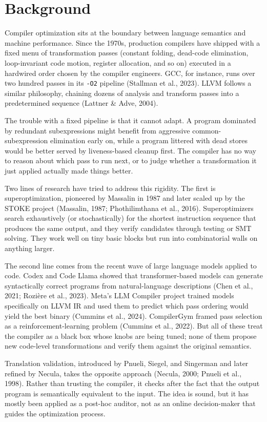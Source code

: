 \documentclass[12pt,a4paper]{report}
\begin{document}
\section{Background}

Compiler optimization sits at the boundary between language semantics and machine performance. Since the 1970s, production compilers have shipped with a fixed menu of transformation passes (constant folding, dead-code elimination, loop-invariant code motion, register allocation, and so on) executed in a hardwired order chosen by the compiler engineers. GCC, for instance, runs over two hundred passes in its \texttt{-O2} pipeline (Stallman et al., 2023). LLVM follows a similar philosophy, chaining dozens of analysis and transform passes into a predetermined sequence (Lattner \& Adve, 2004).

The trouble with a fixed pipeline is that it cannot adapt. A program dominated by redundant subexpressions might benefit from aggressive common-subexpression elimination early on, while a program littered with dead stores would be better served by liveness-based cleanup first. The compiler has no way to reason about which pass to run next, or to judge whether a transformation it just applied actually made things better.

Two lines of research have tried to address this rigidity. The first is superoptimization, pioneered by Massalin in 1987 and later scaled up by the STOKE project (Massalin, 1987; Phothilimthana et al., 2016). Superoptimizers search exhaustively (or stochastically) for the shortest instruction sequence that produces the same output, and they verify candidates through testing or SMT solving. They work well on tiny basic blocks but run into combinatorial walls on anything larger.

The second line comes from the recent wave of large language models applied to code. Codex and Code Llama showed that transformer-based models can generate syntactically correct programs from natural-language descriptions (Chen et al., 2021; Rozi\`ere et al., 2023). Meta's LLM Compiler project trained models specifically on LLVM IR and used them to predict which pass ordering would yield the best binary (Cummins et al., 2024). CompilerGym framed pass selection as a reinforcement-learning problem (Cummins et al., 2022). But all of these treat the compiler as a black box whose knobs are being tuned; none of them propose new code-level transformations and verify them against the original semantics.

Translation validation, introduced by Pnueli, Siegel, and Singerman and later refined by Necula, takes the opposite approach (Necula, 2000; Pnueli et al., 1998). Rather than trusting the compiler, it checks after the fact that the output program is semantically equivalent to the input. The idea is sound, but it has mostly been applied as a post-hoc auditor, not as an online decision-maker that guides the optimization process.
\end{document}
